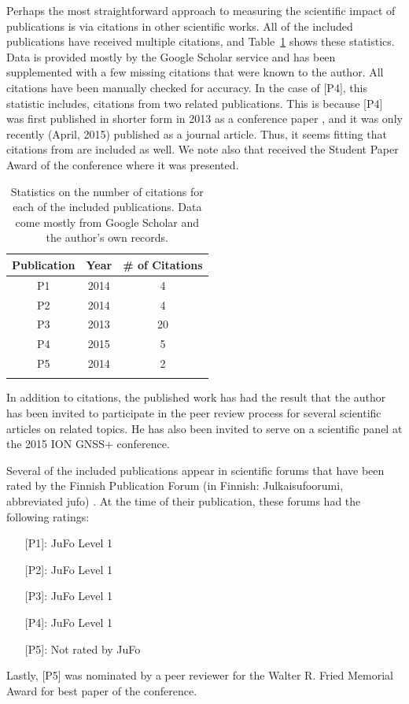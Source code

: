 Perhaps the most straightforward approach to measuring the scientific impact of publications is via citations in other scientific works. All of the included publications have received multiple citations, and Table~\ref{table:citations} shows these statistics. Data is provided mostly by the Google Scholar service and has been supplemented with a few missing citations that were known to the author. All citations have been manually checked for accuracy. In the case of [P4], this statistic includes, citations from two related publications. This is because [P4] was first published in shorter form in 2013 as a conference paper \cite{Guinness2013}, and it was only recently (April, 2015) published as a journal article. Thus, it seems fitting that citations from \cite{Guinness2013} are included as well. We note also that \cite{Guinness2013} received the Student Paper Award of the conference where it was presented.
%
\begin{table}
\centering
\begin{tabular}{ccc}
\hline\noalign{\smallskip}
\textbf{Publication} & \textbf{Year} & \textbf{\# of Citations}\\
\hline\noalign{\smallskip}
P1 & 2014 & 4\\
P2 & 2014 & 4\\
P3 & 2013 & 20\\
P4 & 2015 & 5\\
P5 & 2014 & 2\\
\hline\noalign{\smallskip}
\end{tabular}
\caption[Citation statistics for included publications]{Statistics on the number of citations for each of the included publications. Data come mostly from Google Scholar and the author's own records.}\label{table:citations}
\end{table}
%
In addition to citations, the published work has had the result that the author has been invited to participate in the peer review process for several scientific articles on related topics. He has also been invited to serve on a scientific panel at the 2015 ION GNSS+ conference.

Several of the included publications appear in scientific forums that have been rated by the Finnish Publication Forum (in Finnish: Julkaisufoorumi, abbreviated \acrshort{jufo}) \cite{jufo}. At the time of their publication, these forums had the following ratings:

\begin{itemize}
  \setlength\itemsep{0em}
  \item[] [P1]: JuFo Level 1
  \item[] {[P2]}: JuFo Level 1
  \item[] {[P3]}: JuFo Level 1
  \item[] {[P4]}: JuFo Level 1
  \item[] {[P5]}: Not rated by JuFo
\end{itemize}

Lastly, [P5] was nominated by a peer reviewer for the Walter R. Fried Memorial Award for best paper of the conference.



